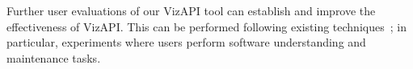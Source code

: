 Further user evaluations of our VizAPI tool can establish and improve the
effectiveness of VizAPI. This can be performed following
existing techniques~\cite{merino18:_system_liter_review_softw_visual_evaluat}; in
particular, experiments where users perform software
understanding and maintenance tasks.
